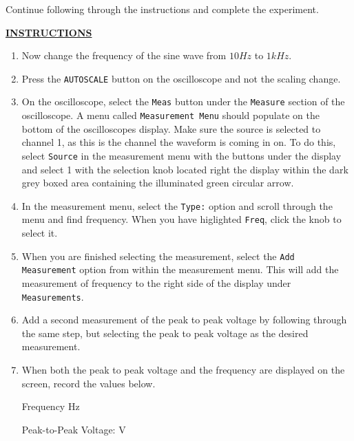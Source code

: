 \documentclass[12pt]{article}
\begin{document}
Continue following through the instructions and complete the experiment.

\textbf{\underline{INSTRUCTIONS}}

\begin{enumerate}
    \item Now change the frequency of the sine wave from $10 Hz$ to $1kHz$. 
    \item Press the \texttt{AUTOSCALE} button on the oscilloscope and not the scaling change.
    \item On the oscilloscope, select the \texttt{Meas} button under the \texttt{Measure} section of the oscilloscope. A menu called \texttt{Measurement Menu} should populate on the bottom of the oscilloscopes display. Make sure the source is selected to channel 1, as this is the channel the waveform is coming in on. To do this, select \texttt{Source} in the measurement menu with the buttons under the display and select 1 with the selection knob located right the display within the dark grey boxed area containing the illuminated green circular arrow.
    \item In the measurement menu, select the \texttt{Type:} option and scroll through the menu and find frequency. When you have higlighted \texttt{Freq}, click the knob to select it.
    \item When you are finished selecting the measurement, select the \texttt{Add Measurement} option from within the measurement menu. This will add the measurement of frequency to the right side of the display under \texttt{Measurements}.
    \item Add a second measurement of the peak to peak voltage by following through the same step, but selecting the peak to peak voltage as the desired measurement.
    \item When both the peak to peak voltage and the frequency are displayed on the screen, record the values below.
    
    \begin{center}
    Frequency   \underline{\hspace{2cm}} Hz
    
   Peak-to-Peak Voltage: \underline{\hspace{2cm}} V
\end{center}
\end{enumerate}
\end{document}
